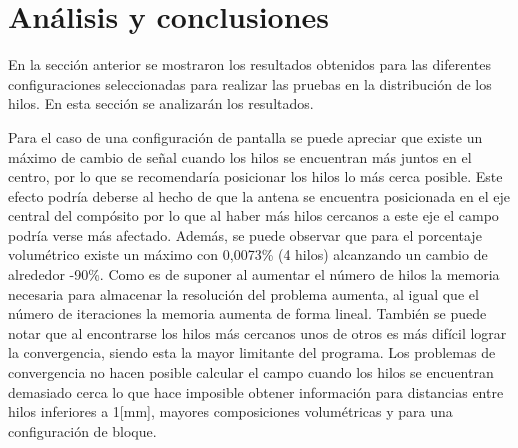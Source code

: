 \documentclass[12pt,letterpaper]{article}
\numberwithin{equation}{section}
\begin{document}
\section{Análisis y conclusiones} \label{sec:Analisis y conclusiones}
En la sección anterior se mostraron los resultados obtenidos para las diferentes configuraciones seleccionadas para realizar las pruebas en la distribución de los hilos. En esta sección se analizarán los resultados.

Para el caso de una configuración de pantalla se puede apreciar que existe un máximo de cambio de señal cuando los hilos se encuentran más juntos en el centro, por lo que se recomendaría posicionar los hilos lo más cerca posible. Este efecto podría deberse al hecho de que la antena se encuentra posicionada en el eje central del compósito por lo que al haber más hilos cercanos a este eje el campo podría verse más afectado. Además, se puede observar que para el porcentaje volumétrico existe un máximo con 0,0073\% (4 hilos) alcanzando un cambio de alrededor -90\%. Como es de suponer al aumentar el número de hilos la memoria necesaria para almacenar la resolución del problema aumenta, al igual que el número de iteraciones la memoria aumenta de forma lineal.  También se puede notar que al encontrarse los hilos más cercanos unos de otros es más difícil lograr la convergencia, siendo esta la mayor limitante del programa. Los problemas de convergencia no hacen posible calcular el campo cuando los hilos se encuentran demasiado cerca lo que hace imposible obtener información para distancias entre hilos inferiores a 1[mm], mayores composiciones volumétricas y para una configuración de bloque.
\end{document}
